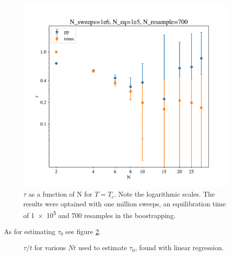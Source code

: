 \documentclass{article}
\begin{document}
\begin{figure}[H]
  \centering
  \includegraphics[width=.75\textwidth]{media/tau_N}
  \caption{$\tau$ as a function of N for $T=T_c$.
    Note the logarithmic scales.
    The results were optained with one million sweeps, an equilibration time of \num{1e5} and 700 resamples in the boostrapping.
    \label{fig:tau_N}}
\end{figure}

As for estimating $\tau_0$ see figure \ref{fig:tau_TN}.


\begin{figure}[H]
  \centering
  \caption{$\tau/t$ for various $Nt$ used to estimate $\tau_0$, found with linear regression.
    \label{fig:tau_TN}}
\end{figure}
\end{document}

